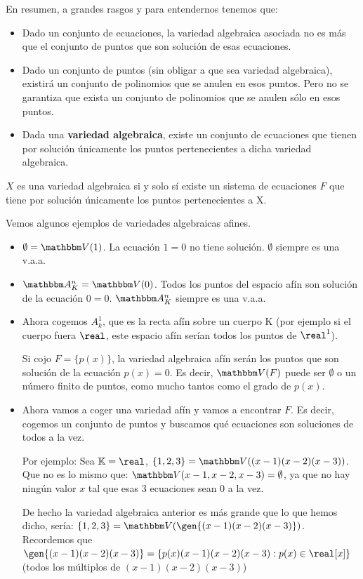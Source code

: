 En resumen, a grandes rasgos y para entendernos tenemos que:
\begin{itemize}
	\item Dado un conjunto de ecuaciones, la variedad algebraica asociada no es más que el conjunto de puntos que son solución de esas ecuaciones.
	\item Dado un conjunto de puntos (sin obligar a que sea variedad algebraica), existirá un conjunto de polinomios que se anulen en esos puntos. Pero no se garantiza que exista un conjunto de polinomios que se anulen sólo en esos puntos.
	\item Dada una \textbf{variedad algebraica}, existe un conjunto de ecuaciones que tienen por solución únicamente los puntos pertenecientes a dicha variedad algebraica.
\end{itemize}

\obs $X$ es una variedad algebraica si y solo sí existe un sistema de ecuaciones $F$ que tiene por solución únicamente los puntos pertenecientes a X.

Vemos algunos ejemplos de variedades algebraicas afines.
\begin{example}
	\begin{itemize}
		\item $\emptyset = \V(1)$. La ecuación $1=0$ no tiene solución. $\emptyset$ siempre es una v.a.a.
		\item $\A_K^n=\V(0)$. Todos los puntos del espacio afín son solución de la ecuación $0=0$. $\A_K^n$ siempre es una v.a.a.
		\item Ahora cogemos $A^1_k$, que es la recta afín sobre un cuerpo K (por ejemplo si el cuerpo fuera $\real$, este espacio afín serían todos los puntos de $\real^1$).

		Si cojo $F=\{p(x)\}$, la variedad algebraica afín serán los puntos que son solución de la ecuación $p(x)=0$. Es decir, $\V(F)$ puede ser $\emptyset$ o un número finito de puntos, como mucho tantos como el grado de $p(x)$.
		\item Ahora vamos a coger una variedad afín y vamos a encontrar $F$. Es decir, cogemos un conjunto de puntos y buscamos qué ecuaciones son soluciones de todos a la vez.

		Por ejemplo: Sea $\K=\real$, $\{1,2,3\} =\V((x-1)(x-2)(x-3))$. Que no es lo mismo que: $\V(x-1,x-2,x-3)=\emptyset$, ya que no hay ningún valor $x$ tal que esas 3 ecuaciones sean 0 a la vez.

		De hecho la variedad algebraica anterior es más grande que lo que hemos dicho, sería: $\{1,2,3\} =\V(\gen{(x-1)(x-2)(x-3)})$. Recordemos que $\gen{(x-1)(x-2)(x-3)} = \{ p(x)(x-1)(x-2)(x-3) : p(x) \in \real[x] \}$ (todos los múltiplos de $(x-1)(x-2)(x-3)$)
	\end{itemize}
\end{example}

